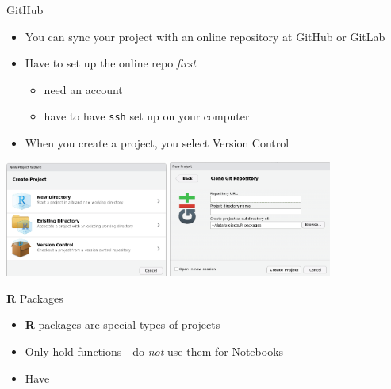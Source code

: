 \documentclass[
  ignorenonframetext,
  aspectratio=169]{beamer}
\providecommand{\tightlist}{%
  \setlength{\itemsep}{0pt}\setlength{\parskip}{0pt}}
\begin{document}
\begin{frame}[fragile]{GitHub}
\protect\hypertarget{github}{}
\begin{itemize}
\tightlist
\item
  You can sync your project with an online repository at GitHub or
  GitLab
\item
  Have to set up the online repo \emph{first}

  \begin{itemize}
  \tightlist
  \item
    need an account
  \item
    have to have \texttt{ssh} set up on your computer
  \end{itemize}
\item
  When you create a project, you select Version Control
\end{itemize}

\includegraphics[width=0.4\textwidth,height=\textheight]{figures/new_project.png}
\includegraphics[width=0.4\textwidth,height=\textheight]{figures/git.png}
\end{frame}

\begin{frame}{\textbf{R} Packages}
\protect\hypertarget{r-packages}{}
\begin{itemize}
\tightlist
\item
  \textbf{R} packages are special types of projects
\item
  Only hold functions - do \emph{not} use them for Notebooks
\item
  Have
\end{itemize}
\end{frame}
\end{document}
